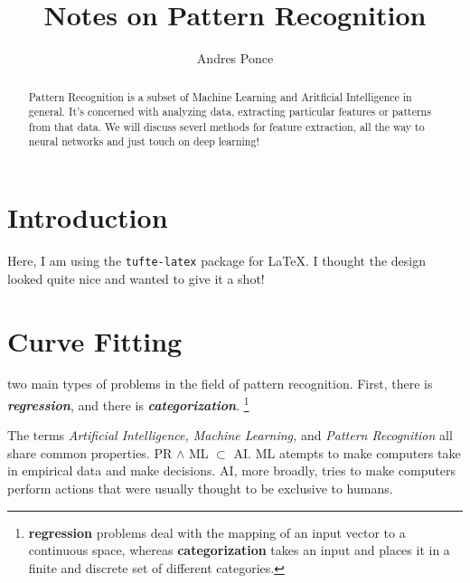 \documentclass{tufte-handout}
\title{Notes on Pattern Recognition}
\author{Andres Ponce}
\begin{document}
\maketitle
\begin{abstract}
		Pattern Recognition is a subset of Machine Learning and Aritficial 
		Intelligence in general. It's concerned with analyzing data, extracting
		particular features or patterns from that data. We will discuss severl 
		methods for feature extraction, all the way to neural networks and 
		just touch on deep learning!
\end{abstract}

\section{Introduction}
Here, I am using the \texttt{tufte-latex} package for \LaTeX. I thought
the design looked quite nice and wanted to give it a shot! 

\section{Curve Fitting}
	 two main types of problems in the field of pattern 
	recognition. First, there is \textit{\textbf{regression}}, and
	there is \textit{\textbf{categorization}}. \footnote{\textbf{regression}
	problems deal with the mapping of an input vector to a continuous space,
	whereas \textbf{categorization} takes an input and places it in a finite 
	and discrete set of different categories.}

	The terms \textit{Artificial Intelligence, Machine Learning,} and 
	\textit{Pattern Recognition} all share common properties. PR $\land$ ML
	$\subset$ AI. ML atempts to make computers take in empirical data and 
	make decisions. AI, more broadly, tries to make computers perform actions
	that were usually thought to be exclusive to humans. 
	
\end{document}
